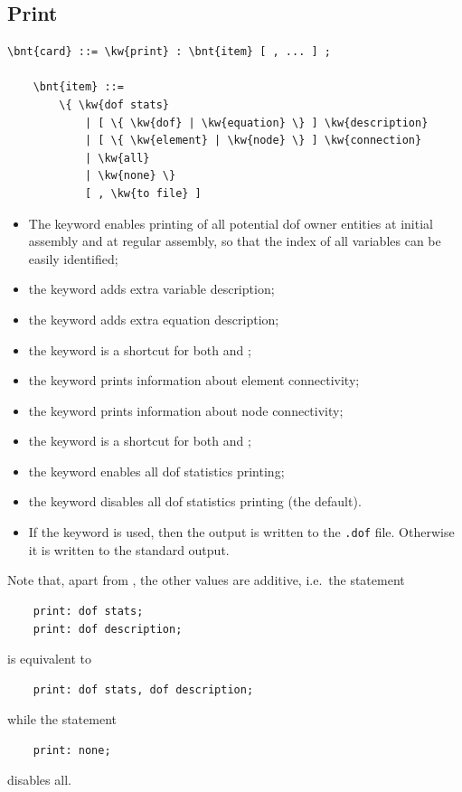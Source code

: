\subsection{Print}\label{sec:CONTROLDATA:PRINT}
\begin{Verbatim}[commandchars=\\\{\}]
    \bnt{card} ::= \kw{print} : \bnt{item} [ , ... ] ;

    \bnt{item} ::=
        \{ \kw{dof stats}
            | [ \{ \kw{dof} | \kw{equation} \} ] \kw{description}
            | [ \{ \kw{element} | \kw{node} \} ] \kw{connection}
            | \kw{all}
            | \kw{none} \}
            [ , \kw{to file} ]
\end{Verbatim}
\begin{itemize}
\item The keyword  enables printing of all potential
	dof owner entities at initial assembly and at regular assembly,
	so that the index of all variables can be easily identified;
\item the keyword  adds extra variable description;
\item the keyword  adds extra equation description;
\item the keyword  is a shortcut for both
	 and ;
\item the keyword  prints information
	about element connectivity;
\item the keyword  prints information
	about node connectivity;
\item the keyword  is a shortcut for both
	 and ;
\item the keyword  enables all dof statistics printing;
\item the keyword  disables all dof statistics printing
	(the default).
\item If the keyword  is used, then the output is written to
  the \texttt{.dof} file. Otherwise it is written to the standard output.
\end{itemize}
Note that, apart from , the other values are additive,
i.e.\ the statement
\begin{verbatim}
    print: dof stats;
    print: dof description;
\end{verbatim}
is equivalent to 
\begin{verbatim}
    print: dof stats, dof description;
\end{verbatim}
while the statement
\begin{verbatim}
    print: none;
\end{verbatim}
disables all.

